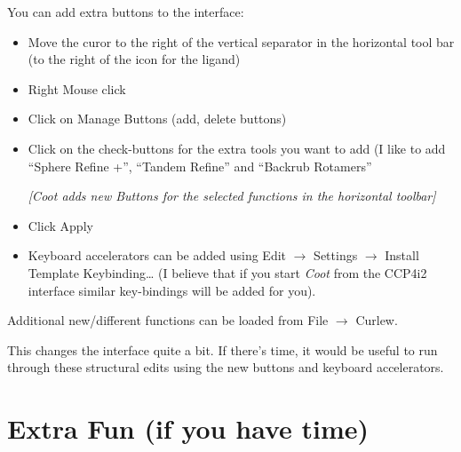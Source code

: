\documentclass{article}
\begin{document}
You can add extra buttons to the interface:

\begin{itemize}

\item Move the curor to the right of the vertical separator in the horizontal tool bar (to the
  right of the icon for the ligand)

\item Right Mouse click

\item  Click on \textsf{Manage Buttons (add, delete buttons)}

\item Click on the check-buttons for the extra tools you want to add (I like to add ``Sphere Refine +'',
  ``Tandem Refine'' and ``Backrub Rotamers''

  \textsl{ [\emph{Coot} adds new Buttons for the selected functions in the horizontal
    toolbar]}

\item Click \textsf{Apply}


\item Keyboard accelerators can be added using \textsf{Edit} $\rightarrow$ \textsf{Settings} $\rightarrow$ \textsf{Install Template Keybinding\ldots} (I believe that if you start \emph{Coot} from the CCP4i2 interface
  similar key-bindings will be added for you).

\end{itemize}

Additional new/different functions can be loaded from \textsf{File} $\rightarrow$ \textsf{Curlew}.

This changes the interface quite a bit. If there's time, it would be useful to run through these
structural edits using the new buttons and keyboard accelerators.

\section{Extra Fun (if you have time)}
\end{document}
